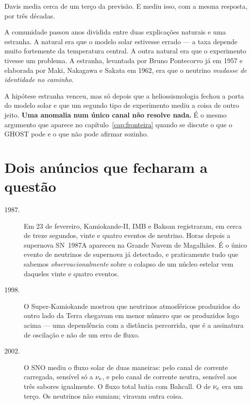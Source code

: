 Davis media cerca de um terço da previsão. E mediu isso, com a mesma resposta,
por três décadas.

A comunidade passou anos dividida entre duas explicações naturais e uma
estranha. A natural era que o modelo solar estivesse errado --- a taxa depende
muito fortemente da temperatura central. A outra natural era que o experimento
tivesse um problema. A estranha, levantada por Bruno Pontecorvo já em 1957 e
elaborada por Maki, Nakagawa e Sakata em 1962, era que o neutrino \emph{mudasse
de identidade no caminho}.

\begin{alerta}
A hipótese estranha venceu, mas só depois que a heliossismologia fechou a porta
do modelo solar e que um segundo tipo de experimento mediu a coisa de outro
jeito. \textbf{Uma anomalia num único canal não resolve nada.} É o mesmo
argumento que aparece no capítulo~\ref{cap:fronteira} quando se discute o que o
GHOST pode e o que não pode afirmar sozinho.
\end{alerta}

\section{Dois anúncios que fecharam a questão}

\begin{description}
\item[1987.] Em 23 de fevereiro, Kamiokande-II, IMB e Baksan registraram, em
  cerca de treze segundos, vinte e quatro eventos de neutrino. Horas depois a
  supernova SN~1987A apareceu na Grande Nuvem de Magalhães. É o único evento de
  neutrinos de supernova já detectado, e praticamente tudo que sabemos
  \emph{observacionalmente} sobre o colapso de um núcleo estelar vem daqueles
  vinte e quatro eventos.

\item[1998.] O Super-Kamiokande mostrou que neutrinos atmosféricos produzidos do
  outro lado da Terra chegavam em menor número que os produzidos logo acima ---
  uma dependência com a distância percorrida, que é a assinatura de oscilação e
  não de um erro de fluxo.

\item[2002.] O SNO mediu o fluxo solar de duas maneiras: pelo canal de corrente
  carregada, sensível só a $\nu_e$, e pelo canal de corrente neutra, sensível aos
  três sabores igualmente. O fluxo total batia com Bahcall. O de $\nu_e$ era um
  terço. Os neutrinos não sumiam; viravam outra coisa.
\end{description}

